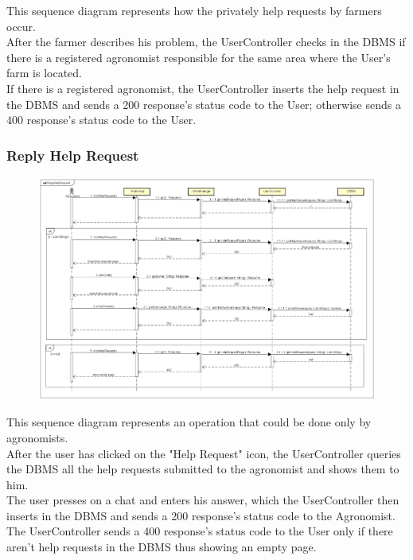 This sequence diagram represents how the privately help requests by farmers occur.\\
After the farmer describes his problem, the UserController checks in the DBMS if there 
is a registered agronomist responsible for the same area where the User's farm is located.\\
If there is a registered agronomist, the UserController inserts the help request in the DBMS and sends 
a 200 response's status code to the User; otherwise sends a 400 response's status code to the User.


\newpage
\subsubsection{Reply Help Request}

\begin{figure}[H]
    \begin{center}
        \includegraphics[width=\textwidth]{Images/SequenceDiagrams/ReplyHelpRequestDD.png}
    \end{center}
\end{figure}

This sequence diagram represents an operation that could be done only by agronomists.\\
After the user has clicked on the "Help Request" icon, the UserController queries the DBMS 
all the help requests submitted to the agronomist and shows them to him.\\
The user presses on a chat and enters his answer, which the UserController then inserts 
in the DBMS and sends a 200 response's status code to the Agronomist.\\
The UserController sends a 400 response's status code to the User only 
if there aren't help requests in the DBMS thus showing an empty page.


